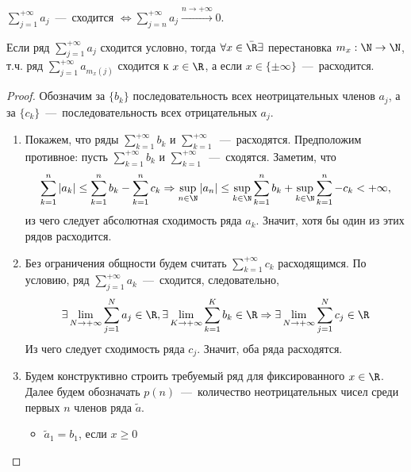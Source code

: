 \begin{note}
$\sum\limits_{j = 1}^{+\infty} a_j$~---~сходится $\Longleftrightarrow \sum\limits_{j = n}^{+\infty} a_j \xrightarrow{n \rightarrow +\infty} 0$.
\end{note}
\begin{theorem}
    Если ряд $\sum\limits_{j = 1}^{+\infty} a_j$ сходится условно, тогда $\forall x \in \bar{\R} \exists$ перестановка $m_x: \N \rightarrow \N$, т.ч. ряд $\sum\limits_{j = 1}^{+\infty} a_{m_x(j)}$ сходится к $x \in \R$, а если $x \in \{\pm\infty\}$~---~расходится.
\end{theorem}
\begin{proof}
    Обозначим за $\{b_k\}$ последовательность всех неотрицательных членов $a_j$, а за $\{c_k\}$~---~последовательность всех отрицательных $a_j$.
    \begin{enumerate}
        \item Покажем, что ряды $\sum\limits_{k = 1}^{+\infty} b_k$ и $\sum\limits_{k = 1}^{+\infty}$~---~расходятся. Предположим противное: пусть $\sum\limits_{k = 1}^{+\infty} b_k$ и $\sum\limits_{k = 1}^{+\infty}$~---~сходятся. Заметим, что
        \[ \sum\limits_{k = 1}^n |a_k| \leq \sum\limits_{k = 1}^n b_k - \sum\limits_{k = 1}^n c_k \Rightarrow \sup\limits_{n \in \N} |a_n| \leq \sup\limits_{k \in \N} \sum\limits_{k = 1}^n b_k + \sup\limits_{k \in \N} \sum\limits_{k = 1}^n -c_k < +\infty,\]
        из чего следует абсолютная сходимость ряда $a_k$. Значит, хотя бы один из этих рядов расходится.
        \item Без ограничения общности будем считать $\sum\limits_{k = 1}^{+\infty} c_k$ расходящимся. По условию, ряд $\sum\limits_{j = 1}^{+\infty} a_k$~---~сходится, следовательно,
        \[\exists \lim\limits_{N \rightarrow +\infty} \sum\limits_{j = 1}^N a_j \in \R, \exists \lim\limits_{K \rightarrow +\infty} \sum\limits_{k = 1}^K b_k \in \R \Rightarrow \exists \lim\limits_{N \rightarrow +\infty} \sum\limits_{j = 1}^N c_j \in \R\]
        Из чего следует сходимость ряда $c_j$. Значит, оба ряда расходятся.
        \item Будем конструктивно строить требуемый ряд для фиксированного $x \in \R$. \\
        Далее будем обозначать $p(n)$~---~количество неотрицательных чисел среди первых $n$ членов ряда $\tilde{a}$. \\
        \begin{itemize}
            \item $\tilde{a}_1 = b_1$, если $x \geq 0$

\end{itemize}
\end{enumerate}
\end{proof}
